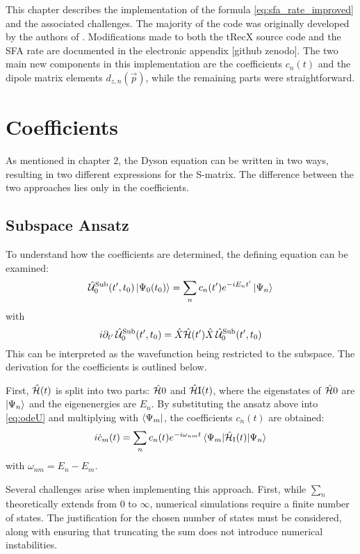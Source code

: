 This chapter describes the implementation of the formula \eqref{eq:sfa_rate_improved} and the associated challenges.
The majority of the code was originally developed by the authors of \cite{Theory_NPS}.
Modifications made to both the tRecX source code and the SFA rate are documented in the electronic appendix [github zenodo].
The two main new components in this implementation are the coefficients $c_n(t)$ and the dipole matrix elements $d_{z,n}(\vec{p})$, while the remaining parts were straightforward.

\section{Coefficients}
As mentioned in chapter 2, the Dyson equation can be written in two ways, resulting in two different expressions for the S-matrix.
The difference between the two approaches lies only in the coefficients.



\subsection{Subspace Ansatz}
To understand how the coefficients are determined, the defining equation can be examined:
\begin{equation*}
    \hat{\mathcal{U}}^{\mathrm{Sub}}_0(t',t_0)\ket{\Psi_0(t_0)} = \sum_{n}c_n(t')e^{-iE_nt'}\ket{\Psi_n}
\end{equation*}
with
\begin{equation}
    i\partial_{t'} \, \hat{\mathcal{U}}^{\mathrm{Sub}}_0(t',t_0) = \hat{X}\hat{\mathcal{H}}(t')\hat{X}\,\hat{\mathcal{U}}^{\mathrm{Sub}}_0(t',t_0)    \label{eq:odeU}
\end{equation}
This can be interpreted as the wavefunction being restricted to the subspace.
The derivation for the coefficients is outlined below.

First, $\hat{\mathcal{H}}(t)$ is split into two parts: $\hat{\mathcal{H}}0$ and $\hat{\mathcal{H}}{\mathrm{I}}(t)$, where the eigenstates of $\hat{\mathcal{H}}0$ are ${\ket{\Psi_n}}$ and the eigenenergies are ${E_n}$.
By substituting the ansatz above into \eqref{eq:odeU} and multiplying with $\bra{\Psi_m}$, the coefficients $c_n(t)$ are obtained:
\begin{equation*}
    i  \dot{c}_m(t) = \sum_n c_n(t) e^{-i \omega_{nm} t} \braket{\Psi_m|\hat{\mathcal{H}}_{\mathrm{I}}(t)|\Psi_n}  \label{eq:ode}
\end{equation*}
with $\omega_{nm} = E_n - E_m$.

\medskip
Several challenges arise when implementing this approach.
First, while $\sum_n$ theoretically extends from $0$ to $\infty$, numerical simulations require a finite number of states.
The justification for the chosen number of states must be considered, along with ensuring that truncating the sum does not introduce numerical instabilities.

